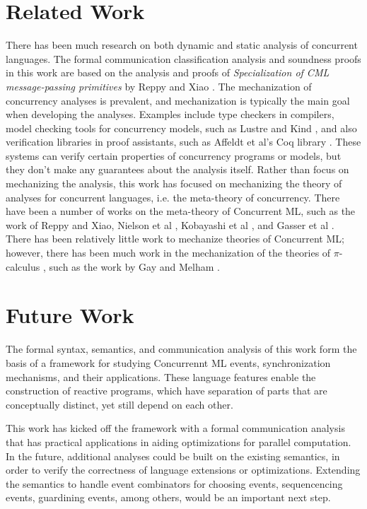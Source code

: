 \documentclass[letterpaper, 11pt]{extarticle}
\begin{document}
\section{Related Work}
There has been much research on both dynamic and static analysis of concurrent languages. 
The formal communication classification analysis and soundness proofs in this work are
based on the analysis and proofs of \textit{Specialization of CML message-passing primitives}
by Reppy and Xiao \cite{reppy2007specialization}.
The mechanization of concurrency analyses is prevalent, and mechanization is typically the main
goal when developing the analyses. Examples include type checkers in compilers,
model checking tools for concurrency models, such as Lustre \cite{halbwachs1991synchronous} and Kind \cite{kind},
and also verification libraries in proof assistants, such as Affeldt et al's Coq library \cite{affeldt2008coq}.
These systems can verify certain properties of concurrency programs or models, but they don't
make any guarantees about the analysis itself.
Rather than focus on mechanizing the analysis, this work has focused on
mechanizing the theory of analyses for concurrent languages, i.e. the meta-theory of concurrency.
There have been a number of works on the meta-theory of Concurrent ML,
such as the work of Reppy and Xiao, Nielson et al \cite{nielson1994higher}, Kobayashi et al \cite{kobayashi1995static}, and Gasser et al \cite{gasser1997systematic}.
There has been relatively little work to mechanize theories of Concurrent ML; however,
there has been much work in the mechanization of the theories of $\pi$-calculus
\cite{milner1999communicating}, such as the work by Gay \cite{gay2001framework} and Melham \cite{melham1994mechanized}. 

\section{Future Work}
The formal syntax, semantics, and communication analysis of this work form the basis of
a framework for studying Concurrennt ML events, synchronization mechanisms, and their
applications. These language features enable the construction of reactive programs, which
have separation of parts that are conceptually distinct, yet still depend on each
other.

This work has kicked off the framework with a formal communication analysis that has practical
applications in aiding optimizations for parallel computation. In the future, additional
analyses could be built on the existing semantics, in order to verify the correctness of language 
extensions or optimizations. Extending the semantics to handle event combinators for choosing
events, sequencencing events, guardining events, among others, would be an important next step.
\end{document}
